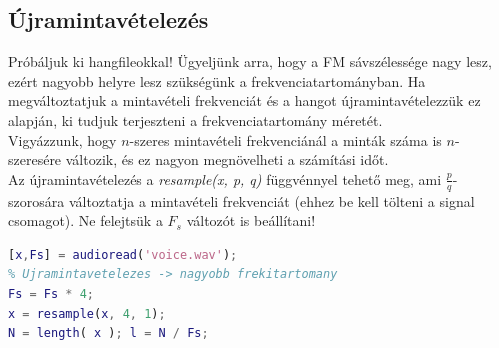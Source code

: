 \documentclass[12pt,a4paper]{article}
\begin{document}
\subsection{Újramintavételezés}

Próbáljuk ki hangfileokkal! Ügyeljünk arra, hogy a FM sávszélessége nagy lesz, ezért nagyobb helyre lesz szükségünk a frekvenciatartományban. Ha megváltoztatjuk a mintavételi frekvenciát és a hangot újramintavételezzük ez alapján, ki tudjuk terjeszteni a frekvenciatartomány méretét. \\
Vigyázzunk, hogy $n$-szeres mintavételi frekvenciánál a minták száma is $n$-szeresére változik, és ez nagyon megnövelheti a számítási időt. \\
Az újramintavételezés a \textit{resample(x, p, q)} függvénnyel tehető meg, ami $\frac{p}{q}$-szorosára változtatja a mintavételi frekvenciát (ehhez be kell tölteni a signal csomagot). Ne felejtsük a $F_s$ változót is beállítani!
\begin{lstlisting}[frame=single,language=matlab,caption=Újramintavételezés]
[x,Fs] = audioread('voice.wav');
% Ujramintavetelezes -> nagyobb frekitartomany
Fs = Fs * 4;
x = resample(x, 4, 1);
N = length( x ); l = N / Fs;
\end{lstlisting}
\end{document}
